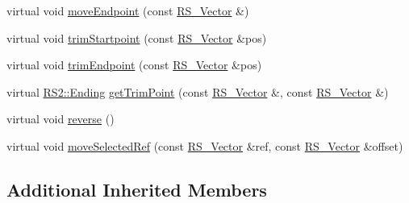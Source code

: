 \begin{DoxyCompactItemize}
\item 
virtual void \hyperlink{class_r_s___atomic_entity_a7e35f48ae53da907f698e0e73887a1ca}{move\-Endpoint} (const \hyperlink{class_r_s___vector}{R\-S\-\_\-\-Vector} \&)
\item 
virtual void \hyperlink{class_r_s___atomic_entity_a33af8cca51e643cffbac55f3dbf9f670}{trim\-Startpoint} (const \hyperlink{class_r_s___vector}{R\-S\-\_\-\-Vector} \&pos)
\item 
virtual void \hyperlink{class_r_s___atomic_entity_a021db5f1757de41b2fe385d22bf2aaea}{trim\-Endpoint} (const \hyperlink{class_r_s___vector}{R\-S\-\_\-\-Vector} \&pos)
\item 
virtual \hyperlink{class_r_s2_a30e80df2ef4bb36f4e89ea500eb212ab}{R\-S2\-::\-Ending} \hyperlink{class_r_s___atomic_entity_a7bb9189a26b1cd6e17d6b6283190d05c}{get\-Trim\-Point} (const \hyperlink{class_r_s___vector}{R\-S\-\_\-\-Vector} \&, const \hyperlink{class_r_s___vector}{R\-S\-\_\-\-Vector} \&)
\item 
virtual void \hyperlink{class_r_s___atomic_entity_a70264ad0d8a6ffac2af46e6be94e8f69}{reverse} ()
\item 
virtual void \hyperlink{class_r_s___atomic_entity_ae25b3ef890c15bc0fcd8a9fa4308bdbc}{move\-Selected\-Ref} (const \hyperlink{class_r_s___vector}{R\-S\-\_\-\-Vector} \&ref, const \hyperlink{class_r_s___vector}{R\-S\-\_\-\-Vector} \&offset)
\end{DoxyCompactItemize}
\subsection*{Additional Inherited Members}


